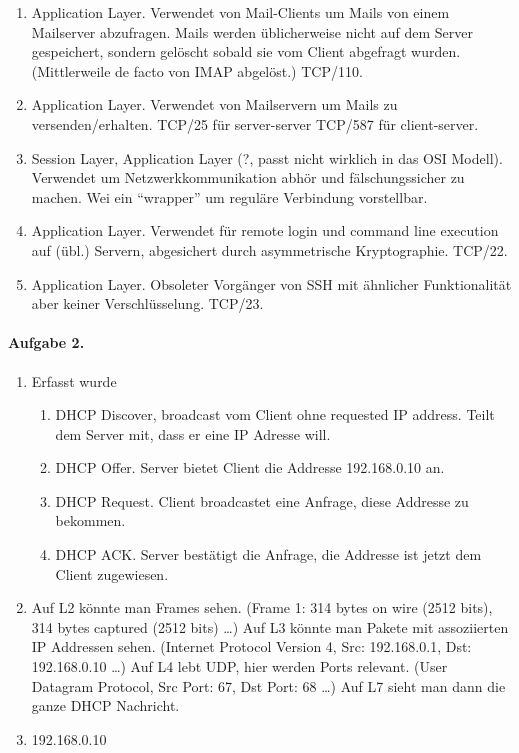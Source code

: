 \documentclass{article}
\begin{document}
\begin{enumerate}[label=\roman*.]
    \item Application Layer. Verwendet von Mail-Clients um Mails von einem Mailserver abzufragen. Mails werden \"ublicherweise nicht auf dem Server gespeichert, sondern gel\"oscht sobald sie vom Client abgefragt wurden. (Mittlerweile de facto von IMAP abgel\"ost.) TCP/110.
    
    \item Application Layer. Verwendet von Mailservern um Mails zu versenden/erhalten. TCP/25 f\"ur server-server TCP/587 f\"ur client-server.
    
    \item Session Layer, Application Layer (?, passt nicht wirklich in das OSI Modell). Verwendet um Netzwerkkommunikation abh\"or und f\"alschungssicher zu machen. Wei ein \enquote{wrapper} um regul\"are Verbindung vorstellbar.
    
    \item Application Layer. Verwendet f\"ur remote login und command line execution auf (\"ubl.) Servern, abgesichert durch asymmetrische Kryptographie. TCP/22.
    
    \item Application Layer. Obsoleter Vorg\"anger von SSH mit \"ahnlicher Funktionalit\"at aber keiner Verschl\"usselung. TCP/23.
\end{enumerate}

\paragraph{Aufgabe 2.}

\begin{enumerate}
    \item Erfasst wurde
    \begin{enumerate}
        \item DHCP Discover, broadcast vom Client ohne requested IP address. Teilt dem Server mit, dass er eine IP Adresse will.
        \item DHCP Offer. Server bietet Client die Addresse 192.168.0.10 an.
        \item DHCP Request. Client broadcastet eine Anfrage, diese Addresse zu bekommen.
        \item DHCP ACK. Server best\"atigt die Anfrage, die Addresse ist jetzt dem Client zugewiesen.
    \end{enumerate}

    \item Auf L2 k\"onnte man Frames sehen. (Frame 1: 314 bytes on wire (2512 bits), 314 bytes captured (2512 bits) \ldots) Auf L3 k\"onnte man Pakete mit assoziierten IP Addressen sehen. (Internet Protocol Version 4, Src: 192.168.0.1, Dst: 192.168.0.10 \ldots) Auf L4 lebt UDP, hier werden Ports relevant. (User Datagram Protocol, Src Port: 67, Dst Port: 68 \ldots) Auf L7 sieht man dann die ganze DHCP Nachricht.
    
    \item 192.168.0.10
\end{enumerate}
\end{document}
